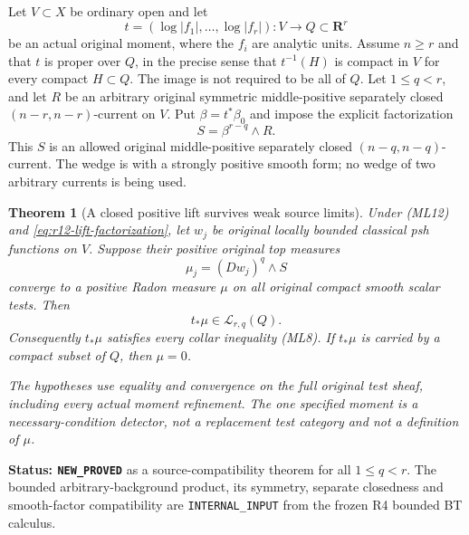 \documentclass[11pt,a4paper]{article}
\numberwithin{equation}{section}
\newtheorem{theorem}{Theorem}[section]
\theoremstyle{definition}
\theoremstyle{remark}
\begin{document}
Let $V\subset X$ be ordinary open and let
\[
 t=(\log|f_1|,\ldots,\log|f_r|):V\longrightarrow Q\subset\mathbf R^r
 \tag{ML12}
\]
be an actual original moment, where the $f_i$ are analytic units.
Assume $n\ge r$ and that $t$ is proper over $Q$, in the precise
sense that $t^{-1}(H)$ is compact in $V$ for every compact
$H\subset Q$.  The image is not required to be all of $Q$.
Let $1\le q<r$, and let $R$ be an arbitrary original symmetric
middle-positive separately closed $(n-r,n-r)$-current on $V$.
Put $\beta=t^*\beta_0$ and impose the explicit factorization
\begin{equation}
                 S=\beta^{r-q}\wedge R.
 \label{eq:r12-lift-factorization}
\end{equation}
This $S$ is an allowed original middle-positive separately closed
$(n-q,n-q)$-current.  The wedge is with a strongly positive smooth
form; no wedge of two arbitrary currents is being used.

\begin{theorem}[A closed positive lift survives weak source limits]
\label{thm:r12-positive-moment-lift}
Under \textup{(ML12)} and
\eqref{eq:r12-lift-factorization}, let $w_j$ be original locally
bounded classical psh functions on $V$.  Suppose their positive
original top measures
\[
                 \mu_j=(Dw_j)^q\wedge S
 \tag{ML13}
\]
converge to a positive Radon measure $\mu$ on all original compact
smooth scalar tests.  Then
\[
                            t_*\mu\in\mathscr L_{r,q}(Q).
 \tag{ML14}
\]
Consequently $t_*\mu$ satisfies every collar inequality
\textup{(ML8)}.  If $t_*\mu$ is carried by a compact subset of
$Q$, then $\mu=0$.

The hypotheses use equality and convergence on the full original
test sheaf, including every actual moment refinement.  The one
specified moment is a necessary-condition detector, not a
replacement test category and not a definition of $\mu$.
\end{theorem}

\noindent\textbf{Status: \texttt{NEW\_PROVED}} as a
source-compatibility theorem for all $1\le q<r$.  The bounded
arbitrary-background product, its symmetry, separate closedness
and smooth-factor compatibility are \texttt{INTERNAL\_INPUT}
from the frozen R4 bounded BT calculus.
\end{document}
